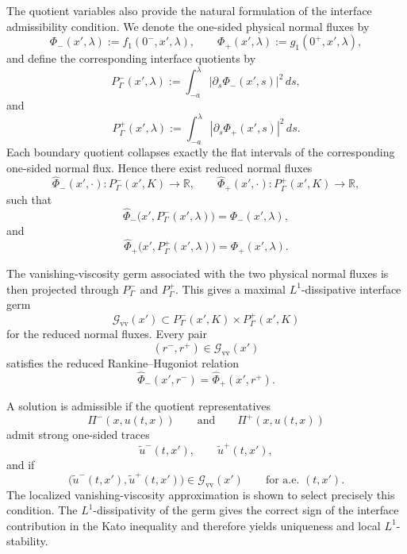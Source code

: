 \documentclass[11pt]{amsart}
\numberwithin{equation}{section}
\theoremstyle{plain}
\theoremstyle{definition}
\theoremstyle{remark}
\begin{document}
The quotient variables also provide the natural formulation of the interface
admissibility condition.  We denote the one-sided physical normal fluxes by
\[
    \Phi_-(x',\lambda):=f_1(0^-,x',\lambda),
    \qquad
    \Phi_+(x',\lambda):=g_1(0^+,x',\lambda),
\]
and define the corresponding interface quotients by
\[
    P^-_\Gamma(x',\lambda)
    :=
    \int_{-a}^{\lambda}
        \left|
            \partial_s\Phi_-(x',s)
        \right|^2\,ds,
\]
and
\[
    P^+_\Gamma(x',\lambda)
    :=
    \int_{-a}^{\lambda}
        \left|
            \partial_s\Phi_+(x',s)
        \right|^2\,ds.
\]
Each boundary quotient collapses exactly the flat intervals of the
corresponding one-sided normal flux.  Hence there exist reduced normal fluxes
\[
    \widehat\Phi_-(x',\cdot):
    P^-_\Gamma(x',K)\to\mathbb R,
    \qquad
    \widehat\Phi_+(x',\cdot):
    P^+_\Gamma(x',K)\to\mathbb R,
\]
such that
\[
    \widehat\Phi_-
    \bigl(x',P^-_\Gamma(x',\lambda)\bigr)
    =
    \Phi_-(x',\lambda),
\]
and
\[
    \widehat\Phi_+
    \bigl(x',P^+_\Gamma(x',\lambda)\bigr)
    =
    \Phi_+(x',\lambda).
\]

The vanishing-viscosity germ associated with the two physical normal fluxes is
then projected through \(P^-_\Gamma\) and \(P^+_\Gamma\).  This gives a
maximal \(L^1\)-dissipative interface germ
\[
    \mathcal G_{\mathrm{vv}}(x')
    \subset
    P^-_\Gamma(x',K)\times P^+_\Gamma(x',K)
\]
for the reduced normal fluxes.  Every pair
\[
    (r^-,r^+)\in\mathcal G_{\mathrm{vv}}(x')
\]
satisfies the reduced Rankine--Hugoniot relation
\[
    \widehat\Phi_-(x',r^-)
    =
    \widehat\Phi_+(x',r^+).
\]

A solution is admissible if the quotient representatives
\[
    \Pi^-(x,u(t,x))
    \qquad\text{and}\qquad
    \Pi^+(x,u(t,x))
\]
admit strong one-sided traces
\[
    \widetilde u^-(t,x'),
    \qquad
    \widetilde u^+(t,x'),
\]
and if
\[
    \bigl(
        \widetilde u^-(t,x'),
        \widetilde u^+(t,x')
    \bigr)
    \in\mathcal G_{\mathrm{vv}}(x')
    \qquad
    \text{for a.e. }(t,x').
\]
The localized vanishing-viscosity approximation is shown to select precisely
this condition.  The \(L^1\)-dissipativity of the germ gives the correct sign
of the interface contribution in the Kato inequality and therefore yields
uniqueness and local \(L^1\)-stability.
\end{document}
